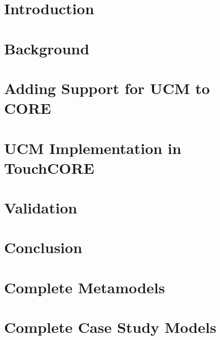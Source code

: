 \documentclass[12pt,letterpaper]{report}
\begin{document}
\renewcommand{\contentsname}{Table of Contents}
\tableofcontents
\listoffigures
\listoftables

\clearpage
{}

\chapter{Introduction}


\chapter{Background}


\chapter{Adding Support for UCM to CORE}


\chapter{UCM Implementation in TouchCORE}


\chapter{Validation}


\chapter{Conclusion}


\begin{appendices}

\chapter{Complete Metamodels}


\chapter{Complete Case Study Models}


\end{appendices}

\renewcommand\bibname{References}
\printbibliography[heading=bibintoc]
\end{document}
